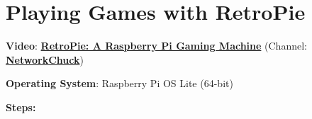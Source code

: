 \section{Playing Games with RetroPie}

\noindent \textbf{Video}: \href{https://www.youtube.com/watch?v=AaseHnf0k2o}{\textbf{\color{blue}RetroPie: A Raspberry Pi Gaming Machine}} (Channel: \href{https://www.youtube.com/@NetworkChuck}{\textbf{\color{blue}NetworkChuck}})

\vspace{0.5cm}

\noindent \textbf{Operating System}: Raspberry Pi OS Lite (64-bit)

\vspace{0.5cm}

\noindent \textbf{Steps:}

